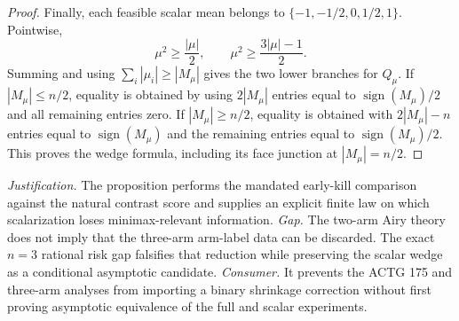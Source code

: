 \documentclass{article}
\begin{document}
\begin{proof}
Finally, each feasible scalar mean belongs to \(\{-1,-1/2,0,1/2,1\}\).  Pointwise,
\[
 \mu^2\geq\frac{|\mu|}{2},
 \qquad
 \mu^2\geq\frac{3|\mu|-1}{2}.
\]
Summing and using \(\sum_i|\mu_i|\geq|M_\mu|\) gives the two lower branches for \(Q_\mu\).  If \(|M_\mu|\leq n/2\), equality is obtained by using \(2|M_\mu|\) entries equal to \(\operatorname{sign}(M_\mu)/2\) and all remaining entries zero.  If \(|M_\mu|\geq n/2\), equality is obtained with \(2|M_\mu|-n\) entries equal to \(\operatorname{sign}(M_\mu)\) and the remaining entries equal to \(\operatorname{sign}(M_\mu)/2\).  This proves the wedge formula, including its face junction at \(|M_\mu|=n/2\).
\end{proof}
\par\smallskip\noindent \textit{Justification.} The proposition performs the mandated early-kill comparison against the natural contrast score and supplies an explicit finite law on which scalarization loses minimax-relevant information. \textit{Gap.} The two-arm Airy theory does not imply that the three-arm arm-label data can be discarded. The exact \(n=3\) rational risk gap falsifies that reduction while preserving the scalar wedge as a conditional asymptotic candidate. \textit{Consumer.} It prevents the ACTG 175 and three-arm analyses from importing a binary shrinkage correction without first proving asymptotic equivalence of the full and scalar experiments.
\end{document}

